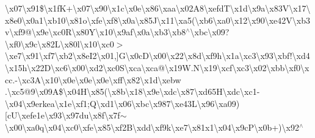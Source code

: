 \begin{DoxyCompactItemize}
\textbackslash{}x07\textbackslash{}x91\$\textbackslash{}x1f\+K+\textbackslash{}x07\textbackslash{}x90\textbackslash{}x1c\textbackslash{}x0e\textbackslash{}x86\textbackslash{}xaa\textbackslash{}x02\+A8\textbackslash{}xefd\+T\textbackslash{}x1d\textbackslash{}x9a\textbackslash{}x83\+V\textbackslash{}x17\textbackslash{}x8e0\textbackslash{}x0a1\textbackslash{}xb10\textbackslash{}x81o\textbackslash{}xfe\textbackslash{}xf8\textbackslash{}x0a\textbackslash{}x85\+J\textbackslash{}x11\textbackslash{}xa5(\textbackslash{}xb6\textbackslash{}xa0\textbackslash{}x12\textbackslash{}x90\textbackslash{}xe42\+V\textbackslash{}xb3v\textbackslash{}xf9@\textbackslash{}x9e\textbackslash{}xc0\+R\textbackslash{}x80\+Y\textbackslash{}x10\textbackslash{}x9af\textbackslash{}x0a\textbackslash{}xb3\textbackslash{}xb8$^\wedge$\textbackslash{}xbc\textbackslash{}x09?\textbackslash{}xf0\textbackslash{}x9c\textbackslash{}x82\+L\textbackslash{}x80l\textbackslash{}x10\textbackslash{}xc0$>$\textbackslash{}xe7\textbackslash{}x91\textbackslash{}xf7\textbackslash{}xb2\textbackslash{}x8e\+I2\textbackslash{}x01,\mbox{]}\+G\textbackslash{}x0c\+D\textbackslash{}x00\textbackslash{}x22\textbackslash{}x8d\textbackslash{}xf9h\textbackslash{}x1a\textbackslash{}xc3\textbackslash{}x93\textbackslash{}xbf!\textbackslash{}xd4\textbackslash{}x15h\textbackslash{}x22\+D\textbackslash{}xc6\textbackslash{}x00\textbackslash{}xd2\textbackslash{}xc0\+S\textbackslash{}xca\textbackslash{}xca@\textbackslash{}x19\+W.\+N\textbackslash{}x19\textbackslash{}xcf\textbackslash{}xc3\textbackslash{}x02\textbackslash{}xbb\textbackslash{}xf0\textbackslash{}xcc.-\/\textbackslash{}xc3\+A\textbackslash{}x10\textbackslash{}x0e\textbackslash{}x0e\textbackslash{}x0e\textbackslash{}xff\textbackslash{}x82\textbackslash{}x1d\textbackslash{}xebw .\textbackslash{}xc5@9\textbackslash{}x09\+A\$\textbackslash{}x04\+H\textbackslash{}x85(\textbackslash{}x8b\textbackslash{}x18\textbackslash{}x9e\textquotesingle{}\textbackslash{}xdc\textbackslash{}x87\textbackslash{}xd65\+H\textbackslash{}xdc\textbackslash{}xc1-\/\textbackslash{}x04\textbackslash{}x9erkea\textbackslash{}x1e\textbackslash{}xf1;\+Q\textbackslash{}xd1\textbackslash{}x06\textbackslash{}xbc\textbackslash{}x987\textbackslash{}xe43\+L\textbackslash{}x96\textbackslash{}xa09)\mbox{[}c\+U\textbackslash{}xefe1e\textbackslash{}x93\textbackslash{}x97du\textbackslash{}x8f\textbackslash{}x7f$\sim$\textbackslash{}x00\textbackslash{}xa0q\textbackslash{}x04\textbackslash{}xc0\textbackslash{}xfe\textbackslash{}x85\textbackslash{}xf2\+B\textbackslash{}xdd\textbackslash{}xf9k\textbackslash{}xe7\textbackslash{}x81x1\textbackslash{}x04\textbackslash{}x9c\+P\textbackslash{}x0b+)\textbackslash{}x92$^\wedge$ 
\end{DoxyCompactItemize}
